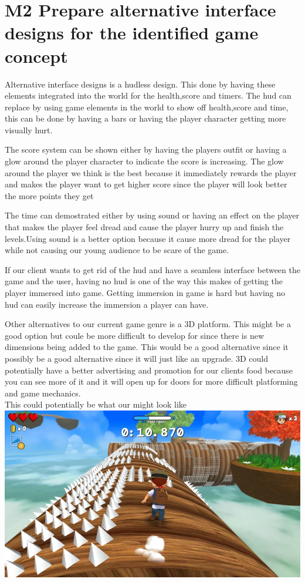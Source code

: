 \documentclass{article}
\begin{document}
\section{M2 Prepare alternative interface designs for the identified game concept}
Alternative interface designs is a hudless design. This done by having these elements integrated into the world for the health,score and timers. 
The hud can replace by using game elements in the world to show off health,score and time, this can be done by having a bars or having the player character getting more visually hurt.

The score system can be shown either by having the players outfit or having a glow around the player character to indicate the score is increasing. The glow around the player  we think is the best because it immediately rewards the player and makes the player want to get higher score since the player will look better the more points they get 

The time can demostrated either  by using sound or having an effect on the player that makes the player feel dread and cause the player hurry up and finish the levels.Using sound is a better option because it cause more dread for the player while not causing our young audience to be scare of the game. 

If our client wants to get rid of the hud and have a seamless interface between the game and the user, having no hud is one of the way this makes of getting the player immersed into game. Getting immersion in game is hard but having no hud can easily increase the immersion a player can have.

Other alternatives to our current game genre is a 3D platform. This might be a good option but coule be more difficult to develop for since there is new dimensions being added to the game. This would be a good alternative since it possibly be a good alternative since it will just like an upgrade. 3D could potentially have a better advertising and promotion for our clients food because you can see more of it and it will open up for doors for more difficult platforming and game mechanics. \\

This could potentially be what our might look like \\
\includegraphics[scale=0.25]{M1}\\
\end{document}
